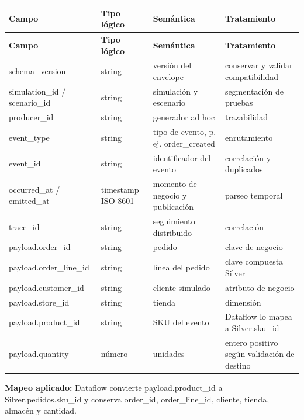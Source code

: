 \documentclass[11pt]{article}
\begin{document}
\begingroup\small
\begin{longtable}{@{}>{\raggedright\arraybackslash}p{}>{\raggedright\arraybackslash}p{}>{\raggedright\arraybackslash}p{}>{\raggedright\arraybackslash}p{}@{}}
\toprule
\textbf{Campo} & \textbf{Tipo lógico} & \textbf{Semántica} & \textbf{Tratamiento} \\
\midrule
\endfirsthead
\toprule
\textbf{Campo} & \textbf{Tipo lógico} & \textbf{Semántica} & \textbf{Tratamiento} \\
\midrule
\endhead
schema\_\allowbreak{}version & string & versión del envelope & conservar y validar compatibilidad \\
simulation\_\allowbreak{}id / scenario\_\allowbreak{}id & string & simulación y escenario & segmentación de pruebas \\
producer\_\allowbreak{}id & string & generador ad hoc & trazabilidad \\
event\_\allowbreak{}type & string & tipo de evento, p. ej. order\_\allowbreak{}created & enrutamiento \\
event\_\allowbreak{}id & string & identificador del evento & correlación y duplicados \\
occurred\_\allowbreak{}at / emitted\_\allowbreak{}at & timestamp ISO 8601 & momento de negocio y publicación & parseo temporal \\
trace\_\allowbreak{}id & string & seguimiento distribuido & correlación \\
payload.order\_\allowbreak{}id & string & pedido & clave de negocio \\
payload.order\_\allowbreak{}line\_\allowbreak{}id & string & línea del pedido & clave compuesta Silver \\
payload.customer\_\allowbreak{}id & string & cliente simulado & atributo de negocio \\
payload.store\_\allowbreak{}id & string & tienda & dimensión \\
payload.product\_\allowbreak{}id & string & SKU del evento & Dataflow lo mapea a Silver.sku\_\allowbreak{}id \\
payload.quantity & número & unidades & entero positivo según validación de destino \\
\bottomrule
\end{longtable}
\endgroup

\textbf{Mapeo aplicado:} Dataflow convierte payload.product\_\allowbreak{}id a Silver.pedidos.sku\_\allowbreak{}id y conserva order\_\allowbreak{}id, order\_\allowbreak{}line\_\allowbreak{}id, cliente, tienda, almacén y cantidad.\par
\end{document}
